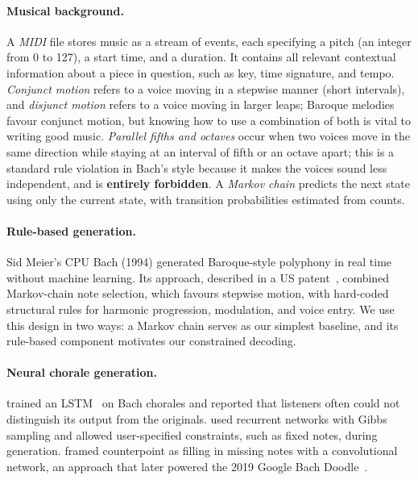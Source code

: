 \documentclass{article}
\begin{document}
\paragraph{Musical background.} A \emph{MIDI} file stores music as a stream of events, each specifying a pitch (an integer from 0 to 127), a start time, and a duration. It contains all relevant contextual information about a piece in question, such as key, time signature, and tempo. \emph{Conjunct motion} refers to a voice moving in a stepwise manner (short intervals), and \emph{disjunct motion} refers to a voice moving in larger leaps; Baroque melodies favour conjunct motion, but knowing how to use a combination of both is vital to writing good music. \emph{Parallel fifths and octaves} occur when two voices move in the same direction while staying at an interval of fifth or an octave apart; this is a standard rule violation in Bach's style because it makes the voices sound less independent, and is \textbf{entirely forbidden}. A \emph{Markov chain} predicts the next state using only the current state, with transition probabilities estimated from counts.

\paragraph{Rule-based generation.} Sid Meier's CPU Bach (1994) generated Baroque-style polyphony in real time without machine learning. Its approach, described in a US patent~\cite{cpubach}, combined Markov-chain note selection, which favours stepwise motion, with hard-coded structural rules for harmonic progression, modulation, and voice entry. We use this design in two ways: a Markov chain serves as our simplest baseline, and its rule-based component motivates our constrained decoding.

\paragraph{Neural chorale generation.} \citet{liang2016bachbot} trained an LSTM~\cite{hochreiter1997lstm} on Bach chorales and reported that listeners often could not distinguish its output from the originals. \citet{hadjeres2017deepbach} used recurrent networks with Gibbs sampling and allowed user-specified constraints, such as fixed notes, during generation. \citet{huang2017coconet} framed counterpoint as filling in missing notes with a convolutional network, an approach that later powered the 2019 Google Bach Doodle~\cite{huang2019doodle}.
\end{document}
